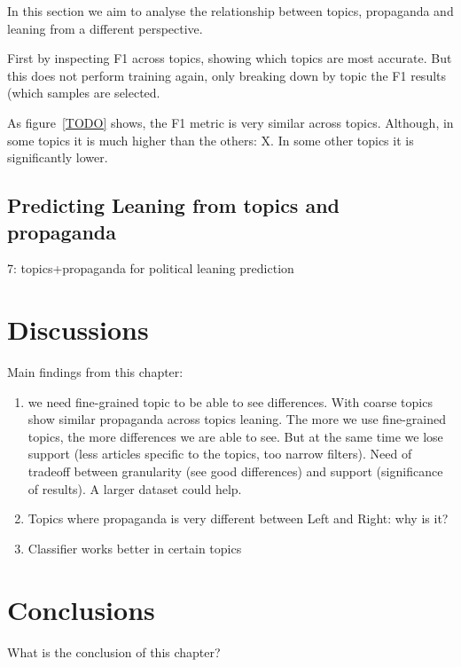 In this section we aim to analyse the relationship between topics, propaganda and leaning from a different perspective.

First by inspecting F1 across topics, showing which topics are most accurate.
But this does not perform training again, only breaking down by topic the F1 results (which samples are selected.


As figure~\ref{TODO} shows, the F1 metric is very similar across topics.
Although, in some topics it is much higher than the others: X.
In some other topics it is significantly lower.




\subsection{Predicting Leaning from topics and propaganda}
\label{sec:topic_classifier_propaganda_2}

7: topics+propaganda for political leaning prediction

\section{\statusred Discussions}
\label{sec:topic_discussion}

Main findings from this chapter:

\begin{enumerate}
    \item we need fine-grained topic to be able to see differences. With coarse topics show similar propaganda across topics leaning. The more we use fine-grained topics, the more differences we are able to see. But at the same time we lose support (less articles specific to the topics, too narrow filters). Need of tradeoff between granularity (see good differences) and support (significance of results). A larger dataset could help.
    \item Topics where propaganda is very different between Left and Right: why is it?
    \item Classifier works better in certain topics
\end{enumerate}


\section{Conclusions}
\label{sec:topic_conclusion}

What is the conclusion of this chapter?